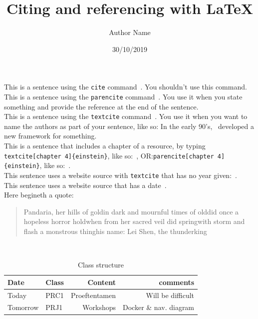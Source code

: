 \documentclass{report}
\title{Citing and referencing with LaTeX}
\author{Author Name}
\date {30/10/2019}
\begin{document}
\maketitle

This is a sentence using the \texttt{cite} command~\cite{latexcompanion}. You shouldn't use this command.\\

This is a sentence using the \texttt{parencite} command~\parencite{latexcompanion}. You use it when you state something and provide the reference at the end of the sentence.\\

This is a sentence using the \texttt{textcite} command~\textcite{latexcompanion}. You use it when you want to name the authors as part of your sentence, like so:
In the early 90's,~\textcite{latexcompanion} developed a new framework for something.\\
	
This is a sentence that includes a chapter of a resource, by typing\newline 
\texttt{textcite[chapter 4]\{einstein\}}, like so:~\textcite[Chapter 4]{einstein}, OR:\newline\texttt{parencite[chapter 4]\{einstein\}}, like so:~\parencite[Chapter 4]{einstein}.\\
	
This sentence uses a website source with \texttt{textcite} that has no year given:\newline~\textcite{Stormstout}.	\\

This sentence uses a website source that has a date~\parencite{WinNT}.\\

Here begineth a quote:
\begin{quote}
	Pandaria, her hills of gold\newline in dark and mournful times of old\newline did once a hopeless horror hold\newline when from her sacred veil did spring\newline with storm and flash a monstrous thing\newline his name: Lei Shen, the thunderking
\end{quote}~\parencite{Stormstout}\\

\begin{center}
\begin{table}[!h]		
\begin{tabular}{l|l|r|r}
	Date & Class & Content & comments\\ \hline
	Today & PRC1 & Proeftentamen & Will be difficult\\
	Tomorrow & PRJ1 & Workshops & Docker \& nav. diagram\\
\end{tabular}
\caption{Class structure}
\label{table:classes}
\end{table}
\end{center}
\end{document}
